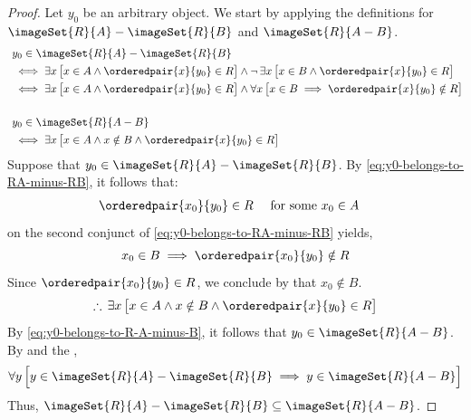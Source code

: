 \begin{proof}
    Let \( y_{0} \) be an arbitrary object. We start by applying the definitions for \( \imageSet{R}{A} - \imageSet{R}{B} \) and \( \imageSet{R}{A-B} \).
    \begin{align}
        &y_{0} \in \imageSet{R}{A} - \imageSet{R}{B} \notag \\
        &\iff
        \exists x \, \big[ x \in A \land \orderedpair{x}{y_{0}} \in R \big]\land \lnot \, \exists x \, \big[ x \in B \land \orderedpair{x}{y_{0}} \in R \big] \notag \\
        &\iff
        \exists x \, \big[ x \in A \land \orderedpair{x}{y_{0}} \in R \big]
        \land
        \forall x \, \big[ x \in B \implies \orderedpair{x}{y_{0}} \notin R \big] \label{eq:y0-belongs-to-RA-minus-RB} \\
        \text{   } \notag \\
        &y_{0} \in \imageSet{R}{A-B} \notag \\
        &\iff
        \exists x \, \big[ x \in A \land x \notin B \land \orderedpair{x}{y_{0}} \in R \big] \label{eq:y0-belongs-to-R-A-minus-B}
    \end{align}
    Suppose that \( y_{0} \in \imageSet{R}{A} - \imageSet{R}{B} \). By \eqref{eq:y0-belongs-to-RA-minus-RB}, it follows that:
    \begin{equation*}
        \begin{aligned}
            \orderedpair{x_{0}}{y_{0}} \in R&
        \end{aligned}
        \text{  }
        \begin{aligned}
            &\text{for some \( x_{0} \in A \)}
        \end{aligned}
    \end{equation*}
     on the second conjunct of \eqref{eq:y0-belongs-to-RA-minus-RB} yields,
    \begin{equation*}
        x_{0} \in B \implies \orderedpair{x_{0}}{y_{0}} \notin R
    \end{equation*}
    Since \( \orderedpair{x_{0}}{y_{0}} \in R\), we conclude by  that \( x_{0} \notin B \).
    \begin{equation*}
        \therefore \, \exists x \, \big[ x \in A \land x \notin B \land \orderedpair{x}{y_{0}} \in R \big]
    \end{equation*}
    By \eqref{eq:y0-belongs-to-R-A-minus-B}, it follows that \( y_{0} \in \imageSet{R}{A-B} \). By 
    and the ,
    \begin{equation*}
        \forall y \, \Big[ y \in \imageSet{R}{A} - \imageSet{R}{B} \implies y \in \imageSet{R}{A-B} \Big]
    \end{equation*}
    Thus, \( \imageSet{R}{A} - \imageSet{R}{B} \subseteq \imageSet{R}{A-B} \).
\end{proof}

